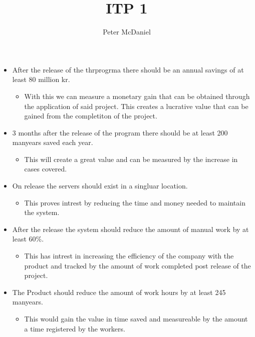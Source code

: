 \documentclass[12pt,a4paper]{report}
\title{ITP 1}
\author{Peter McDaniel}
\begin{document}
        \maketitle
        \newpage
    \section*{}
    \begin{itemize}
        \item After the release of the thrprogrma there should be an annual savings of at least 80 million kr.
        \begin{itemize}
            \item With this we can measure a monetary gain that can be obtained through the application of said project. This creates a lucrative value that can be gained from the completiton of the project.
        \end{itemize}
        \item 3 months after the release of the program there should be at least 200 manyears saved each year.
        \begin{itemize}
            \item  This will create a great value and can be measured by the increase in cases covered.
        \end{itemize}
        \item On release the servers should exist in a singluar location.
        \begin{itemize}
            \item This proves intrest by reducing the time and money needed to maintain the system.
        \end{itemize}
        \item After the release the system should reduce the amount of manual work by at least 60\%.
        \begin{itemize}
            \item This has intrest in increasing the efficiency of the company with the product and tracked by the amount of work completed post release of the project.
        \end{itemize}
        \item The Product should reduce the amount of work hours by at least 245 manyears.
        \begin{itemize}
            \item This would gain the value in time saved and measureable by the amount a time registered by the workers.
        \end{itemize}
    \end{itemize}
\end{document}
